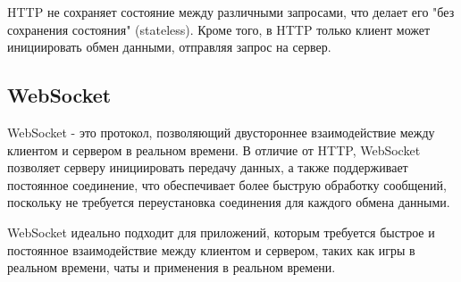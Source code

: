 HTTP не сохраняет состояние между различными запросами, что делает его "без сохранения состояния" (stateless). Кроме того, в HTTP только клиент может инициировать обмен данными, отправляя запрос на сервер.

\subsection*{WebSocket}

WebSocket - это протокол, позволяющий двустороннее взаимодействие между клиентом и сервером в реальном времени. В отличие от HTTP, WebSocket позволяет серверу инициировать передачу данных, а также поддерживает постоянное соединение, что обеспечивает более быструю обработку сообщений, поскольку не требуется переустановка соединения для каждого обмена данными.

WebSocket идеально подходит для приложений, которым требуется быстрое и постоянное взаимодействие между клиентом и сервером, таких как игры в реальном времени, чаты и применения в реальном времени.

